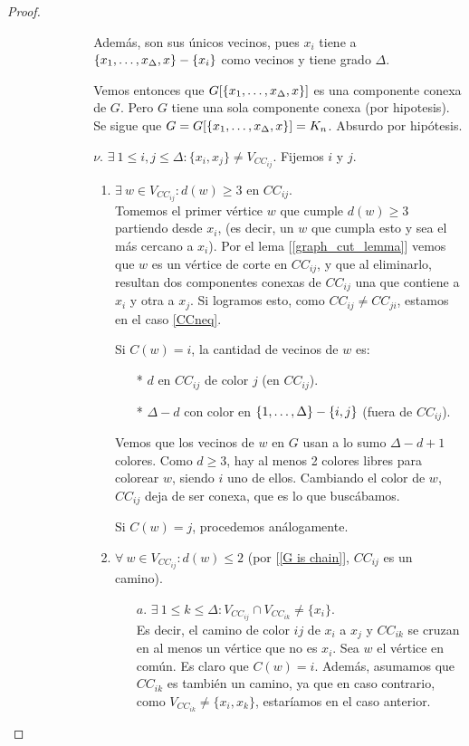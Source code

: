 \begin{proof}
\begin{enumerate}
\begin{enumerate}
\begin{enumerate}
\begin{itemize}
        Además, son sus únicos vecinos, pues $x_i$ tiene a $\{x_1, \mathellipsis, x_\Delta, x\} - \{x_i\}$ como vecinos y tiene grado $\Delta$.
        
        Vemos entonces que $G[\{x_1, \mathellipsis, x_\Delta, x\}]$ es una componente conexa de $G$. Pero $G$ tiene una sola componente conexa (por hipotesis). Se sigue que $G = G[\{x_1,\mathellipsis,x_\Delta, x\}] = K_n$. Absurdo por hipótesis.

        \item[$\nu.$] \label{nu} $\exists~ 1 \le i,j \le \Delta \colon \{x_i,x_j\} \neq V_{CC_{ij}}$. Fijemos $i$ y $j$.
        \begin{enumerate}
            \item $\exists~ w \in V_{CC_{ij}} \colon d(w) \ge 3$  en $CC_{ij}$.\\
            Tomemos el primer vértice $w$ que cumple $d(w) \ge 3$ partiendo desde $x_i$, (es decir, un $w$ que cumpla esto y sea el más cercano a $x_i$). Por el lema [\ref{graph_cut_lemma}] vemos que $w$ es un vértice de corte en $CC_{ij}$, y que al eliminarlo, resultan dos componentes conexas de $CC_{ij}$ una que contiene a $x_i$ y otra a $x_j$. Si logramos esto, como $CC_{ij} \neq CC_{ji}$, estamos en el caso \ref{CCneq}.
            
            Si $C(w) = i$, la cantidad de vecinos de $w$ es:
            \begin{itemize}
                \item[*] $d$ en $CC_{ij}$ de color $j$ (en $CC_{ij}$).
                \item[*] $\Delta - d$ con color en $\{1, \mathellipsis, \Delta\} - \{i,j\}$ (fuera de $CC_{ij}$).
            \end{itemize}
        Vemos que los vecinos de $w$ en $G$ usan a lo sumo $\Delta - d + 1$ colores.
        Como $d \ge 3$, hay al menos 2 colores libres para colorear $w$, siendo $i$ uno de ellos. Cambiando el color de $w$, $CC_{ij}$ deja de ser conexa, que es lo que buscábamos.
        
        Si $C(w) = j$, procedemos análogamente.\\
    
        \item $\forall~ w \in V_{CC_{ij}} \colon d(w) \le 2$ (por [\ref{G is chain}], $CC_{ij}$ es un camino).
        \begin{itemize}
            \item[$a.$] \label{CCdisjoint} $\exists~ 1 \le k \le \Delta \colon V_{CC_{ij}} \cap V_{CC_{ik}} \neq \{x_i\}$.\\
            Es decir, el camino de color $ij$ de $x_i$ a $x_j$ y $CC_{ik}$ se cruzan en al menos un vértice que no es $x_i$. Sea $w$ el vértice en común. Es claro que $C(w) = i$. Además, asumamos que $CC_{ik}$ es también un camino, ya que en caso contrario, como $V_{CC_{ik}} \neq \{x_i, x_k\}$, estaríamos en el caso anterior.
            

\end{itemize}
\end{enumerate}
\end{itemize}
\end{enumerate}
\end{enumerate}
\end{enumerate}
\end{proof}
